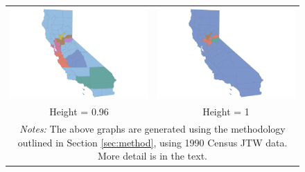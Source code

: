 \begin{figure}[th]
\begin{tabular}{cc}
\includegraphics[scale=0.1]{./figures/insetmaps/california_clustermap_960_inset6.png} & \includegraphics[scale=0.1]{./figures/insetmaps/california_clustermap_1000_inset6.png} \\
Height = 0.96 & Height = 1\\
\multicolumn{2}{p{5in}}{\footnotesize \emph{Notes:} The above graphs are generated using the methodology outlined in Section \ref{sec:method}, using 1990 Census JTW data. More detail is in the text.}
\end{tabular}
\end{figure}


